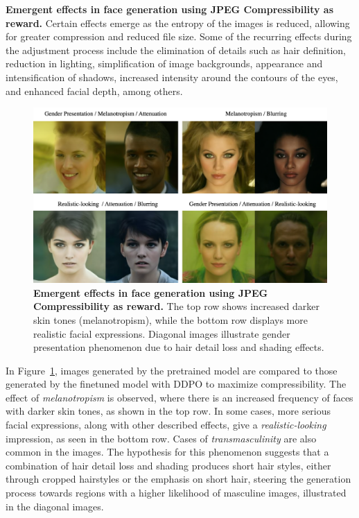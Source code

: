 \noindent \textbf{Emergent effects in face generation using JPEG Compressibility as reward.} Certain effects emerge as the entropy of the images is reduced, allowing for greater compression and reduced file size. Some of the recurring effects during the adjustment process include the elimination of details such as hair definition, reduction in lighting, simplification of image backgrounds, appearance and intensification of shadows, increased intensity around the contours of the eyes, and enhanced facial depth, among others. \\

\begin{figure}[ht]
  \centering
  \includegraphics[scale=0.85]{img/results/compressibility-effects.png}
  \vspace{-0pt}  %
    \captionsetup{width=\textwidth} %
    \caption{\textbf{Emergent effects in face generation using JPEG Compressibility as reward.} The top row shows increased darker skin tones (melanotropism), while the bottom row displays more realistic facial expressions. Diagonal images illustrate gender presentation phenomenon due to hair detail loss and shading effects.}
    \label{fig:compressibility-effects}
\end{figure}

\noindent In Figure~\ref{fig:compressibility-effects}, images generated by the pretrained model are compared to those generated by the finetuned model with DDPO to maximize compressibility. The effect of \textit{melanotropism} is observed, where there is an increased frequency of faces with darker skin tones, as shown in the top row. In some cases, more serious facial expressions, along with other described effects, give a \textit{realistic-looking} impression, as seen in the bottom row. Cases of \textit{transmasculinity} are also common in the images. The hypothesis for this phenomenon suggests that a combination of hair detail loss and shading produces short hair styles, either through cropped hairstyles or the emphasis on short hair, steering the generation process towards regions with a higher likelihood of masculine images, illustrated in the diagonal images. \\

